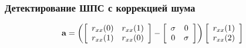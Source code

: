 \subsubsection{Детектирование ШПС с коррекцией шума}

\begin{center}
\begin{equation}
	\label{eq:lpc_gps_1}
	{\bf a} = 
		\left(
			\left[ \begin{array}{cc}
				r_{xx}(0) & r_{xx}(1) \\
				r_{xx}(1) & r_{xx}(0)
			\end{array} \right] -
			\left[ \begin{array}{cc}
				\sigma & 0 \\
				0 & \sigma
			\end{array} \right] 
		\right)
		\left[ \begin{array}{c}
			r_{xx}(1) \\
			r_{xx}(2)
		\end{array} \right]
\end{equation}

\end{center}
\newpage

